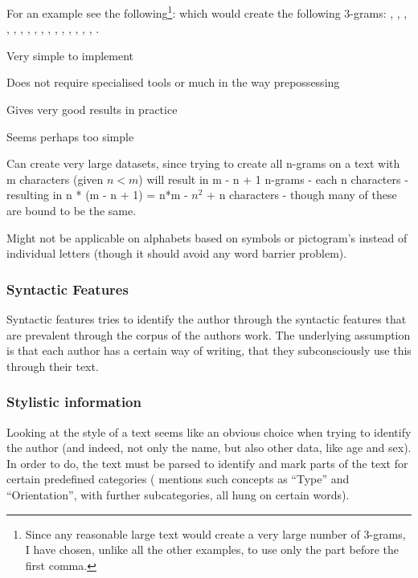For an example see the following\footnote{Since any reasonable large text would create a very large number of 3-grams, I have chosen, unlike all the other examples, to use only the part before the first comma.}:
which would create the following 3-grams: , , , , , , , , , , , , , , , , . 

\ad
{
\item Very simple to implement
\item Does not require specialised tools or much in the way prepossessing
\item Gives very good results in practice
}
{
\item Seems perhaps too simple
\item Can create very large datasets, since trying to create all n-grams on a text with m characters (given $n < m$) will result in m - n + 1 n-grams - each n characters - resulting in n * (m - n + 1) = n*m - $n^2$ + n characters - though many of these are bound to be the same.
\item Might not be applicable on alphabets based on symbols or pictogram's instead of individual letters (though it should avoid any word barrier problem).
}

\subsubsection{Syntactic Features}
Syntactic features tries to identify the author through the syntactic
features that are prevalent through the corpus of the authors
work. The underlying assumption is that each author has a certain way of writing, that they subconsciously use this through their text. 



\subsubsection{Stylistic information}
Looking at the style of a text seems like an obvious choice when trying to identify the author (and indeed, not only the name, but also other data, like age and sex). In order to do, the text must be parsed to identify and mark parts of the text for certain predefined categories (\cite{style} mentions such concepts as ``Type'' and ``Orientation'', with further subcategories, all hung on certain words). 

